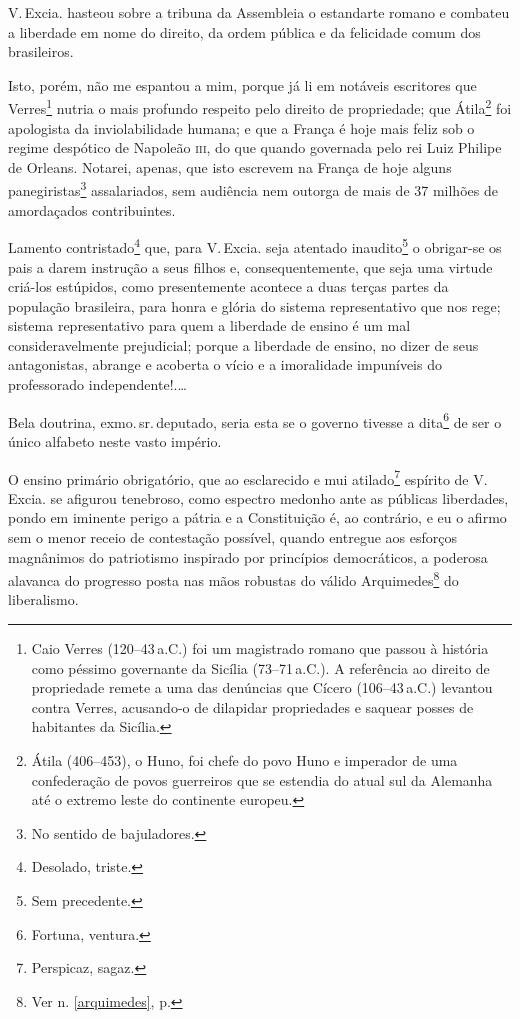 V.\,Excia. hasteou sobre a tribuna da Assembleia o estandarte romano e
combateu a liberdade em nome do direito, da ordem pública e da
felicidade comum dos brasileiros.

Isto, porém, não me espantou a mim, porque já li em notáveis escritores
que Verres\footnote{Caio Verres (120--43\,a.C.) foi um magistrado romano
  que passou à história como péssimo governante da Sicília (73--71\,a.C.).
  A referência ao direito de propriedade remete a uma das denúncias que
  Cícero (106--43\,a.C.) levantou contra Verres, acusando-o de dilapidar
  propriedades e saquear posses de habitantes da Sicília.} nutria o mais
profundo respeito pelo direito de propriedade; que Átila\footnote{Átila (406--453), 
o Huno, foi chefe do povo Huno e imperador de uma
  confederação de povos guerreiros que se estendia do atual sul da
  Alemanha até o extremo leste do continente europeu.} foi apologista da
inviolabilidade humana; e que a França é hoje mais feliz sob o regime
despótico de Napoleão \textsc{iii}, do que quando governada pelo rei Luiz Philipe
de Orleans. Notarei, apenas, que isto escrevem na França de hoje alguns
panegiristas\footnote{No sentido de bajuladores.} assalariados, sem
audiência nem outorga de mais de 37 milhões de amordaçados
contribuintes.

Lamento contristado\footnote{Desolado, triste.} que, para V.\,Excia.
seja atentado inaudito\footnote{Sem precedente.} o obrigar-se os pais
a darem instrução a seus filhos e, consequentemente, que seja uma
virtude criá-los estúpidos, como presentemente acontece a duas terças
partes da população brasileira, para honra e glória do sistema
representativo que nos rege; sistema representativo para quem a
liberdade de ensino é um mal consideravelmente prejudicial; porque a
liberdade de ensino, no dizer de seus antagonistas, abrange e acoberta o
vício e a imoralidade impuníveis do professorado independente!.\ldots{}

Bela doutrina, exmo.\,sr.\,deputado, seria esta se o governo tivesse a
dita\footnote{Fortuna, ventura.} de ser o único alfabeto neste vasto
império.

O ensino primário obrigatório, que ao esclarecido e mui
atilado\footnote{Perspicaz, sagaz.} espírito de V.\,Excia. se afigurou
tenebroso, como espectro medonho ante as públicas liberdades, pondo em
iminente perigo a pátria e a Constituição é, ao contrário, e eu o afirmo
sem o menor receio de contestação possível, quando entregue aos esforços
magnânimos do patriotismo inspirado por princípios democráticos, a
poderosa alavanca do progresso posta nas mãos robustas do válido
Arquimedes\footnote{Ver n. \ref{arquimedes}, p. \pageref{arquimedes}} 
do liberalismo.

